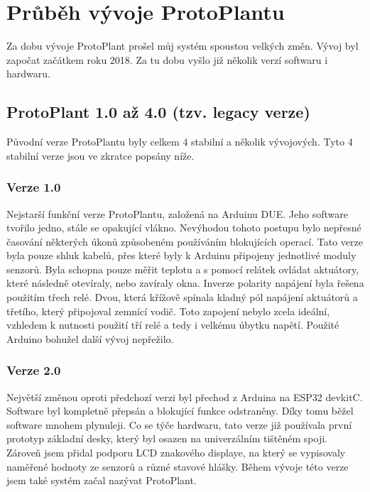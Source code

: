 \chapter{Průběh vývoje ProtoPlantu}
Za dobu vývoje ProtoPlant prošel můj systém spoustou velkých změn.
Vývoj byl započat začátkem roku 2018.
Za tu dobu vyšlo již několik verzí softwaru i hardwaru.

\section{ProtoPlant 1.0 až 4.0 (tzv. legacy verze)}
Původní verze ProtoPlantu byly celkem 4 stabilní a několik vývojových.
Tyto 4 stabilní verze jsou ve zkratce popsány níže.

\subsection{Verze 1.0}
Nejstarší funkční verze ProtoPlantu, založená na Arduinu DUE. 
Jeho software tvořilo jedno, stále se opakující vlákno.
Nevýhodou tohoto postupu bylo nepřesné časování některých úkonů způsobeném používáním blokujících operací.
Tato verze byla pouze shluk kabelů, přes které byly k Arduinu připojeny jednotlivé moduly senzorů.
Byla schopna pouze měřit teplotu a s pomocí relátek ovládat aktuátory, které následně otevíraly, nebo zavíraly okna.
Inverze polarity napájení byla řešena použitím třech relé.
Dvou, která křížově spínala kladný pól napájení aktuátorů a třetího, který připojoval zemnící vodič.
Toto zapojení nebylo zcela ideální, vzhledem k nutnosti použití tří relé a tedy i velkému úbytku napětí.
Použité Arduino bohužel další vývoj nepřežilo.

\subsection{Verze 2.0}
Největší změnou oproti předchozí verzi byl přechod z Arduina na ESP32 devkitC.
Software byl kompletně přepsán a blokující funkce odstraněny.
Díky tomu běžel software mnohem plynuleji.
Co se týče hardwaru, tato verze již používala první prototyp základní desky, který byl osazen na univerzálním tištěném spoji.
Zároveň jsem přidal podporu LCD znakového displaye, na který se vypisovaly naměřené hodnoty ze senzorů a různé stavové hlášky.
Během vývoje této verze jsem také systém začal nazývat ProtoPlant.

